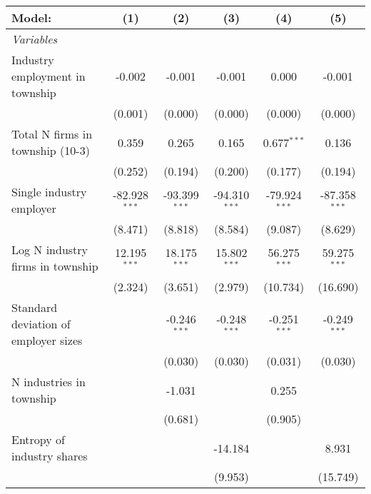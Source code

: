 \begingroup
\centering
\begin{tabular}{lccccc}
   \tabularnewline \midrule \midrule
   Model:                               & (1)             & (2)             & (3)             & (4)             & (5)\\  
   \midrule
   \emph{Variables}\\
   Industry employment in township      & -0.002          & -0.001          & -0.001          & 0.000           & -0.001\\   
                                        & (0.001)         & (0.000)         & (0.000)         & (0.000)         & (0.000)\\   
   Total N firms in township (10-3)     & 0.359           & 0.265           & 0.165           & 0.677$^{***}$   & 0.136\\   
                                        & (0.252)         & (0.194)         & (0.200)         & (0.177)         & (0.194)\\   
   Single industry employer             & -82.928$^{***}$ & -93.399$^{***}$ & -94.310$^{***}$ & -79.924$^{***}$ & -87.358$^{***}$\\   
                                        & (8.471)         & (8.818)         & (8.584)         & (9.087)         & (8.629)\\   
   Log N industry firms in township     & 12.195$^{***}$  & 18.175$^{***}$  & 15.802$^{***}$  & 56.275$^{***}$  & 59.275$^{***}$\\   
                                        & (2.324)         & (3.651)         & (2.979)         & (10.734)        & (16.690)\\   
   Standard deviation of employer sizes &                 & -0.246$^{***}$  & -0.248$^{***}$  & -0.251$^{***}$  & -0.249$^{***}$\\   
                                        &                 & (0.030)         & (0.030)         & (0.031)         & (0.030)\\   
   N industries in township             &                 & -1.031          &                 & 0.255           &   \\   
                                        &                 & (0.681)         &                 & (0.905)         &   \\   
   Entropy of industry shares           &                 &                 & -14.184         &                 & 8.931\\   
                                        &                 &                 & (9.953)         &                 & (15.749)\\   

\end{tabular}
